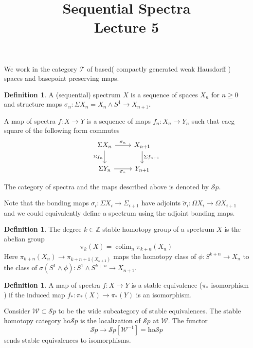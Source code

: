 \documentclass[notitlepage,12pt]{article}
\makeatletter
\theoremstyle{definition}
\newtheorem{definition}[theorem]{Definition}
\theoremstyle{para}{\normalfont}
\newcommand*{\toccontents}{\@starttoc{toc}}
\DeclareMathOperator{\colim}{colim}
\makeatother
\begin{document}
\begin{titlepage}
    \title{Sequential Spectra\\
    Lecture 5
}
\author{  }
	\maketitle
	\thispagestyle{empty}
    	\toccontents
\end{titlepage}

We work in the category $\mathcal{T}$ of based( compactly generated weak Hausdorff ) spaces  and basepoint preserving maps. 
\begin{definition}
    A (sequential) spectrum $X$ is a sequence of spaces $X_n$ for $n\geq 0$ and structure maps $\sigma_n:\Sigma X_n=X_n\wedge S^1\to X_{n+1 }$. 
  
    A map of spectra $f:X\to Y$ is a sequence of maps $f_n:X_n\to Y_n$ such that eacg square of the following form commutes 
    \[
        \begin{tikzcd}
\Sigma X_n \arrow[r, "\sigma_n"] \arrow[d, "\Sigma f_n"'] & X_{n+1} \arrow[d, "\Sigma f_{n+1}"] \\
\Sigma Y_n \arrow[r, "\sigma_n"']                         & Y_{n+1}                            
\end{tikzcd}
    \]

    The category of spectra and the maps described above is denoted by $\mathcal{S}p$.
\end{definition}
Note that the bonding maps $\sigma_i:\Sigma X_i\to \Sigma_{i+1 }$ have adjoints $\tilde{\sigma}_i:\Omega X_i\to \Omega X_{i+1}$ and we could equivalently define a spectrum using the adjoint bonding maps. 

\begin{definition}
    The degree $k\in \mathbb{Z}$ stable homotopy group of a spectrum $X$ is the abelian group 
    \[
        \pi_k(X)=\colim_n \pi_{k+n}(X_n)
    \]Here $\pi_{k+n }(X_n)\to \pi_{k+n+1 (X_{n+1})}$ maps the homotopy class of $\phi:S^{k+n } \to X_n$ to the class of $\sigma(S^1\wedge \phi):S^1\wedge S^{k+n } \to X_{n+1 }$.
\end{definition}

\begin{definition}
    A map of spectra $f:X\to Y$ is a stable equivalence ($\pi_*$ isomorphism ) if the induced map $f_*:\pi_*(X)\to \pi_*(Y)$ is an isomorphism. 
\end{definition}

Consider $\mathcal{W}\subset \mathcal{S}p$ to be the wide subcategory of stable equivalences. The stable homotopy category $\mathrm{ho } \mathcal{S}p$ is the localization of $\mathcal{S}p$ at $\mathcal{W}$. The functor 
\[
    \mathcal{S}p\to \mathcal{S}p[\mathcal{W}^{-1 } ]=\mathrm{ho } \mathcal{S}p
\] sends stable equivalences to isomorphisms. 
\end{document}

